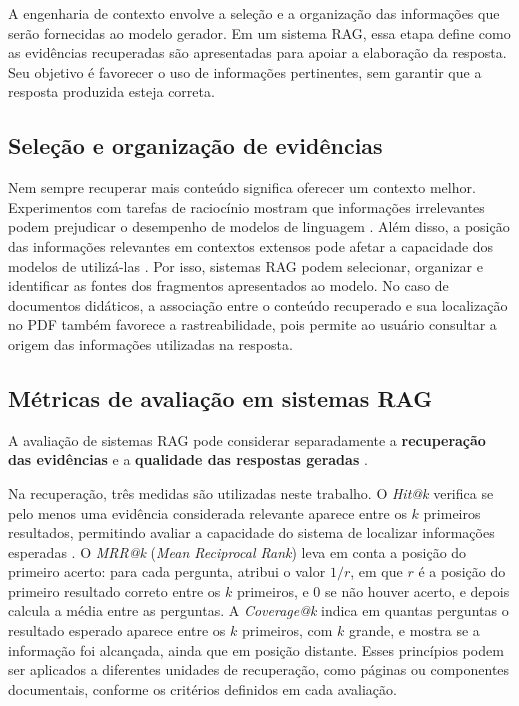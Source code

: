 A engenharia de contexto envolve a seleção e a organização das informações que serão fornecidas ao modelo gerador. Em um sistema RAG, essa etapa define como as evidências recuperadas são apresentadas para apoiar a elaboração da resposta. Seu objetivo é favorecer o uso de informações pertinentes, sem garantir que a resposta produzida esteja correta.

\subsection{Seleção e organização de evidências}
\label{subsec:estrategias_refinamento_contexto}

Nem sempre recuperar mais conteúdo significa oferecer um contexto melhor. Experimentos com tarefas de raciocínio mostram que informações irrelevantes podem prejudicar o desempenho de modelos de linguagem . Além disso, a posição das informações relevantes em contextos extensos pode afetar a capacidade dos modelos de utilizá-las . Por isso, sistemas RAG podem selecionar, organizar e identificar as fontes dos fragmentos apresentados ao modelo. No caso de documentos didáticos, a associação entre o conteúdo recuperado e sua localização no PDF também favorece a rastreabilidade, pois permite ao usuário consultar a origem das informações utilizadas na resposta.


\subsection{Métricas de avaliação em sistemas RAG}
\label{subsec:metricas_rag}

A avaliação de sistemas RAG pode considerar separadamente a \textbf{recuperação das evidências} e a \textbf{qualidade das respostas geradas} .

Na recuperação, três medidas são utilizadas neste trabalho. O \textit{Hit@k} verifica se pelo menos uma evidência considerada relevante aparece entre os $k$ primeiros resultados, permitindo avaliar a capacidade do sistema de localizar informações esperadas . O \textit{MRR@k} (\textit{Mean Reciprocal Rank}) leva em conta a posição do primeiro acerto: para cada pergunta, atribui o valor $1/r$, em que $r$ é a posição do primeiro resultado correto entre os $k$ primeiros, e $0$ se não houver acerto, e depois calcula a média entre as perguntas. A \textit{Coverage@k} indica em quantas perguntas o resultado esperado aparece entre os $k$ primeiros, com $k$ grande, e mostra se a informação foi alcançada, ainda que em posição distante. Esses princípios podem ser aplicados a diferentes unidades de recuperação, como páginas ou componentes documentais, conforme os critérios definidos em cada avaliação.

